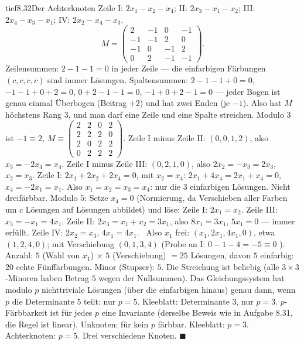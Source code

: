 \begin{loesungkarte}{tief}{8.32}{Der Achterknoten}
Zeile I: $2x_1 - x_2 - x_4$; II: $2x_3 - x_1 - x_2$; III: $2x_4 - x_3 - x_1$; IV: $2x_2 - x_4 - x_3$.
\[ M = \begin{pmatrix}2&-1&0&-1\\-1&-1&2&0\\-1&0&-1&2\\0&2&-1&-1\end{pmatrix}. \]
Zeilensummen: $2 - 1 - 1 = 0$ in jeder Zeile --- die einfarbigen Färbungen $(c, c, c, c)$ sind immer Lösungen. Spaltensummen: $2 - 1 - 1 + 0 = 0$, $-1 - 1 + 0 + 2 = 0$, $0 + 2 - 1 - 1 = 0$, $-1 + 0 + 2 - 1 = 0$ --- jeder Bogen ist genau einmal Überbogen (Beitrag $+2$) und hat zwei Enden (je $-1$). Also hat $M$ höchstens Rang $3$, und man darf eine Zeile und eine Spalte streichen.
Modulo $3$ ist $-1\equiv2$, $M\equiv\begin{pmatrix}2&2&0&2\\2&2&2&0\\2&0&2&2\\0&2&2&2\end{pmatrix}$. Zeile I minus Zeile II: $(0, 0, 1, 2)$, also $x_3 = -2x_4 = x_4$. Zeile I minus Zeile III: $(0, 2, 1, 0)$, also $2x_2 = -x_3 = 2x_3$, $x_2 = x_3$. Zeile I: $2x_1 + 2x_2 + 2x_4 = 0$, mit $x_2 = x_4$: $2x_1 + 4x_4 = 2x_1 + x_4 = 0$, $x_4 = -2x_1 = x_1$. Also $x_1 = x_2 = x_3 = x_4$: nur die $3$ einfarbigen Lösungen. Nicht dreifärbbar.
Modulo $5$: Setze $x_4 = 0$ (Normierung, da Verschieben aller Farben um $c$ Lösungen auf Lösungen abbildet) und löse: Zeile I: $2x_1 = x_2$. Zeile III: $x_3 = -x_1 = 4x_1$. Zeile II: $2x_3 = x_1 + x_2 = 3x_1$, also $8x_1 = 3x_1$, $5x_1 = 0$ --- immer erfüllt. Zeile IV: $2x_2 = x_3$, $4x_1 = 4x_1$. \checkmark\ Also $x_1$ frei: $(x_1, 2x_1, 4x_1, 0)$, etwa $(1, 2, 4, 0)$; mit Verschiebung $(0, 1, 3, 4)$ (Probe an I: $0 - 1 - 4 = -5\equiv0$ \checkmark). Anzahl: $5$ (Wahl von $x_1$) $\times$ $5$ (Verschiebung) $= 25$ Lösungen, davon $5$ einfarbig: $20$ echte Fünffärbungen.
Minor (Stupser): $5$. Die Streichung ist beliebig (alle $3\times3$-Minoren haben Betrag $5$ wegen der Nullsummen). Das Gleichungssystem hat modulo $p$ nichttriviale Lösungen (über die einfarbigen hinaus) genau dann, wenn $p$ die Determinante $5$ teilt: nur $p = 5$. Kleeblatt: Determinante $3$, nur $p = 3$.
$p$-Färbbarkeit ist für jedes $p$ eine Invariante (derselbe Beweis wie in Aufgabe 8.31, die Regel ist linear). Unknoten: für kein $p$ färbbar. Kleeblatt: $p = 3$. Achterknoten: $p = 5$. Drei verschiedene Knoten. $\blacksquare$

\end{loesungkarte}

